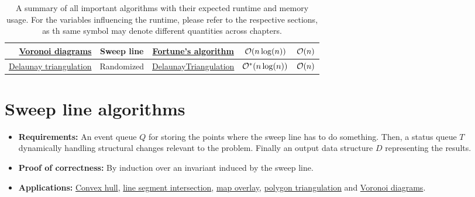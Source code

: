 \begin{table}[!h]
\begin{center}
\begin{tabular}{|r|c|c|c|c|}
                \rowcolor{orange!20} \hyperref[ch:voronoi_diagrams]{Voronoi diagrams} & Sweep line & \hyperref[alg:fortune_voronoi]{Fortune's algorithm} & $\mathcal{O}(n\log(n))$ & $\mathcal{O}(n)$ \\ \hline

                \rowcolor{green!20} \hyperref[ch:delaunay_triangulation]{Delaunay triangulation} & Randomized & \hyperref[alg:delaunay_triangulation]{DelaunayTriangulation} & $\mathcal{O}^\ast(n\log(n))$ & $\mathcal{O}(n)$ \\ \hline\hline
            \end{tabular}
        \end{center}
        \caption{A summary of all important algorithms with their expected runtime and memory usage. For the variables influencing the runtime, please refer to the respective sections, as th same symbol may denote different quantities across chapters.}
    \end{table}

\section{Sweep line algorithms}
    \begin{itemize}
        \item \textbf{Requirements:} An event queue $Q$ for storing the points where the sweep line has to do  something. Then, a status queue $T$ dynamically handling structural changes relevant to the problem. Finally an output data structure $D$ representing the results.

        \item \textbf{Proof of correctness:} By induction over an invariant induced by the sweep line.

        \item \textbf{Applications:} \hyperref[ch:convex_hulls]{Convex hull}, \hyperref[ch:line_segment_intersection]{line segment intersection}, \hyperref[ch:map_overlay]{map overlay}, \hyperref[ch:polygon_triangulation]{polygon triangulation} and \hyperref[ch:voronoi_diagrams]{Voronoi diagrams}.
    \end{itemize}

